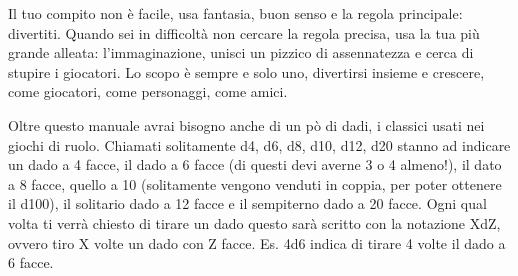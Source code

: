 \documentclass[10pt,a4paper]{article}
\begin{document}
Il tuo compito non è facile, usa fantasia, buon senso e la regola principale: divertiti. Quando sei in difficoltà non cercare la regola precisa, usa la tua più grande alleata: l'immaginazione, unisci un pizzico di assennatezza e cerca di stupire i giocatori. Lo scopo è sempre e solo uno, divertirsi insieme e crescere, come giocatori, come personaggi, come amici.

Oltre questo manuale avrai bisogno anche di un pò di dadi, i classici usati nei giochi di ruolo.
Chiamati solitamente d4, d6, d8, d10, d12, d20 stanno ad indicare un dado a 4 facce, il dado a 6 facce (di questi devi averne 3 o 4 almeno!), il dato a 8 facce, quello a 10 (solitamente vengono venduti in coppia, per poter ottenere il d100), il solitario dado a 12 facce e il sempiterno dado a 20 facce.
Ogni qual volta ti verrà chiesto di tirare un dado questo sarà scritto con la notazione XdZ, ovvero tiro X volte un dado con Z facce. Es. 4d6 indica di tirare 4 volte il dado a 6 facce.
\end{document}
